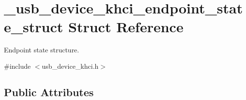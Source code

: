 \hypertarget{struct__usb__device__khci__endpoint__state__struct}{\section{\-\_\-usb\-\_\-device\-\_\-khci\-\_\-endpoint\-\_\-state\-\_\-struct Struct Reference}
\label{struct__usb__device__khci__endpoint__state__struct}
}


Endpoint state structure.  




{\ttfamily \#include $<$usb\-\_\-device\-\_\-khci.\-h$>$}

\subsection*{Public Attributes}
